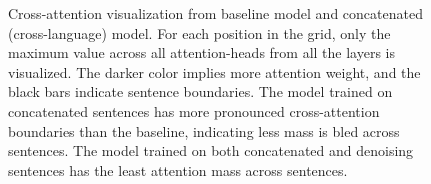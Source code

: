 \begin{figure}[h!tb]
    \caption[Cross-attention visualization from baseline model and concatenated (cross-language) model.]{Cross-attention visualization from baseline model and concatenated (cross-language) model.
     For each position in the grid, only the maximum value across all attention-heads from all the layers is visualized. The darker color implies more attention weight, and the black bars indicate sentence boundaries. The model trained on concatenated sentences has more pronounced cross-attention boundaries than the baseline, indicating less mass is bled across sentences.
     The model trained on both concatenated and denoising sentences has the least attention mass across sentences.}
\label{fig:attnviz-catXL}
\end{figure}

